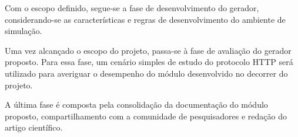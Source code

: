 Com o escopo definido, segue-se a fase de desenvolvimento do gerador, considerando-se as características e regras de desenvolvimento do ambiente de simulação.

Uma vez alcançado o escopo do projeto, passa-se à fase de avaliação do gerador proposto. Para essa fase, um cenário simples de estudo do protocolo HTTP será utilizado para averiguar o desempenho do módulo desenvolvido no decorrer do projeto.

A última fase é composta pela consolidação da documentação do módulo proposto, compartilhamento com a comunidade de pesquisadores e redação do artigo científico.
